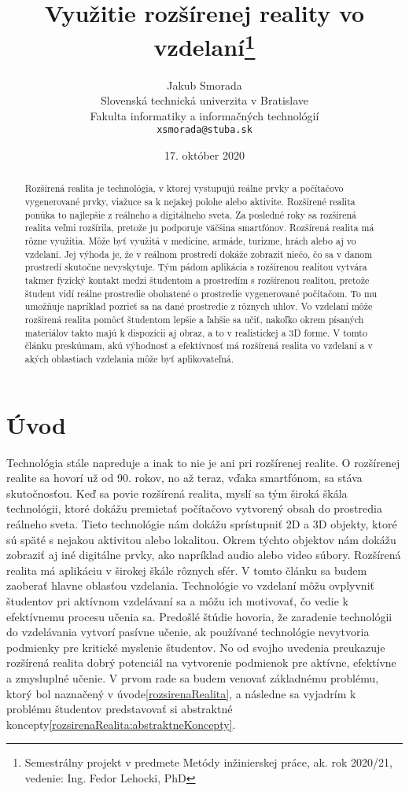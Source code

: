 \documentclass[10pt,twoside,slovak,a4paper]{article}
\title{Využitie rozšírenej reality vo vzdelaní\thanks{Semestrálny projekt v predmete Metódy inžinierskej práce, ak. rok 2020/21, vedenie: Ing. Fedor Lehocki, PhD}}
\author{Jakub Smorada\\[2pt]
	{\small Slovenská technická univerzita v Bratislave}\\
	{\small Fakulta informatiky a informačných technológií}\\
	{\small \texttt{xsmorada@stuba.sk}}
	}
\date{\small 17. október 2020}
\begin{document}
\maketitle

\begin{abstract}
Rozšírená realita je technológia, v ktorej vystupujú reálne prvky a počítačovo vygenerované prvky, viažuce sa k nejakej polohe alebo aktivite.\cite{Yuen2011} 
Rozšírené realita ponúka to najlepšie z reálneho a digitálneho sveta. 
Za posledné roky sa rozšírená realita veľmi rozšírila, pretože ju podporuje väčšina smartfónov. 
Rozšírená realita má rôzne využitia. 
Môže byť využitá v medicíne, armáde, turizme, hrách alebo aj vo vzdelaní. 
Jej výhoda je, že v reálnom prostredí dokáže zobraziť niečo, čo sa v danom prostredí skutočne nevyskytuje. 
Tým pádom aplikácia s rozšírenou realitou vytvára takmer fyzický kontakt medzi študentom a prostredím s rozšírenou realitou, pretože študent vidí reálne prostredie obohatené o prostredie vygenerované počítačom. 
To mu umožňuje napríklad pozrieť sa na dané prostredie z rôznych uhlov. 
Vo vzdelaní môže rozšírená realita pomôcť študentom lepšie a ľahšie sa učiť, nakoľko okrem písaných materiálov takto majú k dispozícii aj obraz, a to v realistickej a 3D forme. 
V tomto článku preskúmam, akú výhodnosť a efektívnosť má rozšírená realita vo vzdelaní a v akých oblastiach vzdelania môže byť aplikovateľná.
\end{abstract}

\section{Úvod}
Technológia stále napreduje a inak to nie je ani pri rozšírenej realite.  
O rozšírenej realite sa hovorí už od 90. rokov, no až teraz, vďaka smartfónom, sa stáva skutočnosťou.\cite{Yuen2011} 
Keď sa povie rozšírená realita, myslí sa tým široká škála technológii, ktoré dokážu premietať počítačovo vytvorený obsah do prostredia reálneho sveta.\cite{Yuen2011}
Tieto technológie nám dokážu sprístupniť 2D a 3D objekty, ktoré sú späté s nejakou aktivitou alebo lokalitou. 
Okrem týchto objektov nám dokážu zobraziť aj iné digitálne prvky, ako napríklad audio alebo video súbory.\cite{Yuen2011} 
Rozšírená realita má aplikáciu v širokej škále rôznych sfér. V tomto článku sa budem zaoberať hlavne oblasťou vzdelania. 
Technológie vo vzdelaní môžu ovplyvniť študentov pri aktívnom vzdelávaní sa a môžu ich motivovať, čo vedie k efektívnemu procesu učenia sa.\cite{Saidin2015}
Predošlé štúdie hovoria, že zaradenie technológii do vzdelávania vytvorí pasívne učenie, ak používané technológie nevytvoria podmienky pre kritické myslenie študentov.\cite{Saidin2015}
No od svojho uvedenia preukazuje rozšírená realita dobrý potenciál na vytvorenie podmienok pre aktívne, efektívne a zmysluplné učenie.\cite{Saidin2015}
V prvom rade sa budem venovať základnému problému, ktorý bol naznačený v úvode\ref{rozsirenaRealita}, a následne sa vyjadrím k problému študentov predstavovať si abstraktné koncepty\ref{rozsirenaRealita:abstraktneKoncepty}.
\end{document}
